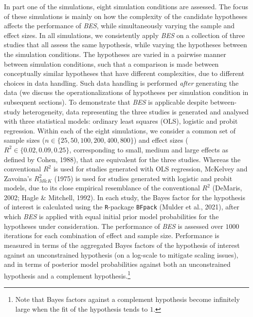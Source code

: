 \documentclass[
]{interact}
\begin{document}
In part one of the simulations, eight simulation conditions are
assessed. The focus of these simulations is mainly on how the complexity
of the candidate hypotheses affects the performance of \emph{BES}, while
simultaneously varying the sample and effect sizes. In all simulations,
we consistently apply \emph{BES} on a collection of three studies that
all assess the same hypothesis, while varying the hypotheses between the
simulation conditions. The hypotheses are varied in a pairwise manner
between simulation conditions, such that a comparison is made between
conceptually similar hypotheses that have different complexities, due to
different choices in data handling. Such data handling is performed
\emph{after} generating the data (we discuss the operationalizations of
hypotheses per simulation condition in subsequent sections). To
demonstrate that \emph{BES} is applicable despite between-study
heterogeneity, data representing the three studies is generated and
analysed with three statistical models: ordinary least squares (OLS),
logistic and probit regression. Within each of the eight simulations, we
consider a common set of sample sizes
(\(n \in \{25, 50, 100, 200, 400, 800\}\)) and effect sizes
(\(R^2 \in \{0.02, 0.09, 0.25\}\), corresponding to small, medium and
large effects as defined by Cohen, 1988), that are equivalent for the
three studies. Whereas the conventional \(R^2\) is used for studies
generated with OLS regression, McKelvey and Zavoina's \(R^2_{M\&K}\)
(1975) is used for studies generated with logistic and probit models,
due to its close empirical resemblance of the conventional \(R^2\)
(DeMaris, 2002; Hagle \& Mitchell, 1992). In each study, the Bayes
factor for the hypothesis of interest is calculated using the
\texttt{R}-package \texttt{BFpack} (Mulder et al., 2021), after which
\emph{BES} is applied with equal initial prior model probabilities for
the hypotheses under consideration. The performance of \emph{BES} is
assessed over \(1000\) iterations for each combination of effect and
sample size. Performance is measured in terms of the aggregated Bayes
factors of the hypothesis of interest against an unconstrained
hypothesis (on a log-scale to mitigate scaling issues), and in terms of
posterior model probabilities against both an unconstrained hypothesis
and a complement hypothesis.\footnote{Note that Bayes factors against a
  complement hypothesis become infinitely large when the fit of the
  hypothesis tends to \(1\).}
\end{document}
